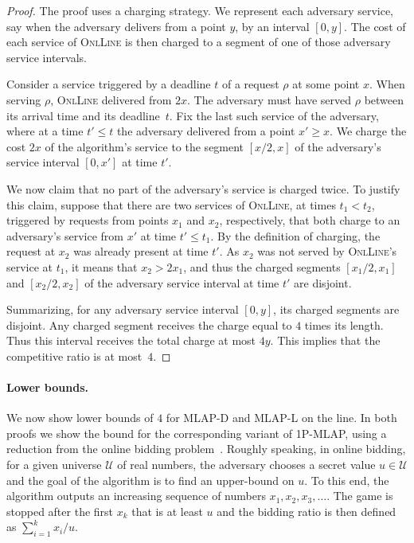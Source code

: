 \documentclass[a4paper]{article}
\newcommand{\DLINE}{\mbox{\textsc{OnlLine}}}
\newcommand{\MLAPL}{\mbox\rm{\textsf{MLAP-L}}}
\newcommand{\MLAPD}{\mbox{\rm\textsf{MLAP-D}}}
\newcommand{\SPMLAP}{\mbox{\rm\textsf{1P-MLAP}}}
\begin{document}
\begin{proof}
The proof uses a charging strategy. We represent each adversary service, say when the 
adversary delivers from a point $y$, by an interval $[0,y]$. The cost of each
service of {\DLINE} is then charged to a segment of one of those adversary service intervals.

Consider a service triggered by a deadline $t$ of a request $\rho$ at some point $x$.
When serving $\rho$, {\DLINE} delivered from $2x$.
The adversary must have served $\rho$ between its arrival time and its
deadline~$t$. Fix the last such service of the adversary, where at a time $t'\le t$ the
adversary delivered from a point $x'\ge x$. We charge the
cost $2x$ of the algorithm's service to the segment $[x/2,x]$ of the
adversary's service interval $[0,x']$ at time $t'$. 

We now claim that no part of the adversary's service is charged twice.
To justify this claim, suppose that there are two services of {\DLINE}, at 
times $t_1 < t_2$, triggered by requests from points $x_1$ and $x_2$, respectively, 
that both charge to an adversary's service from $x'$ at time $t' \leq t_1$. 
By the definition of charging, the request at $x_2$ was 
already present at time $t'$. As $x_2$ was not served 
by {\DLINE}'s service at $t_1$, it means that $x_2 > 2 x_1$, and thus
the charged segments $[x_1/2,x_1]$ and $[x_2/2,x_2]$ of the adversary service
interval at time $t'$ are disjoint.

Summarizing, for any adversary service interval $[0,y]$, its charged
segments are disjoint. Any charged segment receives the charge equal to
$4$ times its length. Thus this interval receives the total charge
at most $4y$. This implies that the competitive ratio is at most~$4$.
\end{proof}


\paragraph{Lower bounds.}

We now show lower bounds of $4$ for {\MLAPD} and {\MLAPL} on the line.
In both proofs we show the bound for the corresponding
variant of {\SPMLAP}, using a reduction from the online bidding
problem~\cite{doubling-sigact,online-bidding}. Roughly speaking, in online
bidding, for a given universe $\mathcal{U}$ of real numbers, the adversary chooses a secret
value $u \in \mathcal{U}$ and the goal of the algorithm is to find an upper-bound
on $u$. To this end, the algorithm outputs an increasing sequence of numbers
$x_1, x_2, x_3, \ldots$. The game is stopped after the first $x_k$ that is at
least $u$ and the bidding ratio is then defined as $\sum_{i=1}^k x_i / u$.
\end{document}

